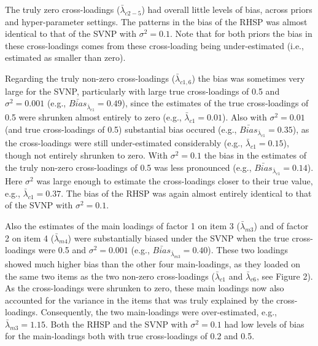 \documentclass[]{interact}
\theoremstyle{plain}%
\theoremstyle{definition}
\theoremstyle{remark}
\begin{document}
The truly zero cross-loadings (\(\bar{\lambda}_{c 2-5}\)) had overall
little levels of bias, across priors and hyper-parameter settings. The
patterns in the bias of the RHSP was almost identical to that of the
SVNP with \(\sigma^2 = 0.1\). Note that for both priors the bias in
these cross-loadings comes from these cross-loading being
under-estimated (i.e., estimated as smaller than zero).

Regarding the truly non-zero cross-loadings (\(\bar{\lambda}_{c 1, 6}\))
the bias was sometimes very large for the SVNP, particularly with large
true cross-loadings of 0.5 and \(\sigma^2 = 0.001\) (e.g.,
\(\bar{Bias}_{\bar{\lambda}_{c 1}} = 0.49\)), since the estimates of the
true cross-loadings of 0.5 were shrunken almost entirely to zero (e.g.,
\(\bar{\lambda}_{c 1} = 0.01\)). Also with \(\sigma^2 = 0.01\) (and true
cross-loadings of 0.5) substantial bias occured (e.g.,
\(\bar{Bias}_{\bar{\lambda}_{c 1}} = 0.35\)), as the cross-loadings were
still under-estimated considerably (e.g.,
\(\bar{\lambda}_{c 1} = 0.15\)), though not entirely shrunken to zero.
With \(\sigma^2 = 0.1\) the bias in the estimates of the truly non-zero
cross-loadings of 0.5 was less pronounced (e.g.,
\(\bar{Bias}_{\bar{\lambda}_{c 1}} = 0.14\)). Here \(\sigma^2\) was
large enough to estimate the cross-loadings closer to their true value,
e.g., \(\bar{\lambda}_{c 1} = 0.37\). The bias of the RHSP was again
almost entirely identical to that of the SVNP with \(\sigma^2 = 0.1\).

Also the estimates of the main loadings of factor 1 on item 3
(\(\bar{\lambda}_{m 3}\)) and of factor 2 on item 4
(\(\bar{\lambda}_{m 4}\)) were substantially biased under the SVNP when
the true cross-loadings were 0.5 and \(\sigma^2 = 0.001\) (e.g.,
\(\bar{Bias}_{\bar{\lambda}_{m 3}} = 0.40\)). These two loadings showed
much higher bias than the other four main-loadings, as they loaded on
the same two items as the two non-zero cross-loadings
(\(\bar{\lambda}_{c 1}\) and \(\bar{\lambda}_{c 6}\), see Figure 2). As
the cross-loadings were shrunken to zero, these main loadings now also
accounted for the variance in the items that was truly explained by the
cross-loadings. Consequently, the two main-loadings were over-estimated,
e.g., \(\bar{\lambda}_{m 3} = 1.15\). Both the RHSP and the SVNP with
\(\sigma^2 = 0.1\) had low levels of bias for the main-loadings both
with true cross-loadings of 0.2 and 0.5.
\end{document}
